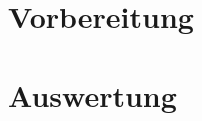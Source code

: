 \documentclass{include/protokollclass}
\begin{document}
    \FrontMatter


    \begingroup \let\clearpage\relax    %
    \tableofcontents                    %
    \listoffigures
    \listoftables
    \endgroup



    \MainMatter
    
            
%    
%
%    
%
%	 

    
    \chapter{Vorbereitung}


	\chapter{Auswertung}
	
    \Appendix

	\begingroup
	\let\clearpage\relax


    
    

    \endgroup
\end{document}
